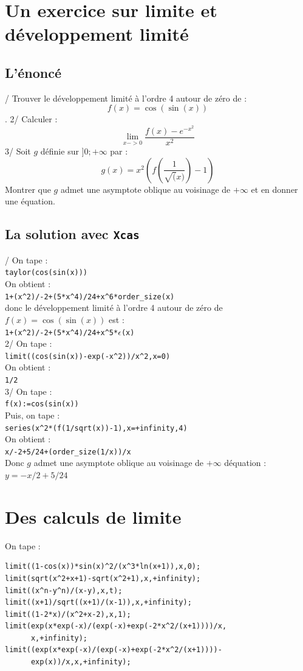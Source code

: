 \documentclass[a4paper,11pt]{book}
\begin{document}
\section{Un exercice sur limite et d\'eveloppement limit\'e}
\subsection{L'\'enonc\'e}
/ Trouver le d\'eveloppement limit\'e \`a l'ordre 4 autour de z\'ero de :
$$f(x)=\cos(\sin(x))$$.
2/ Calculer :
$$\lim_{x->0}\frac{f(x)-e^{-x^2}}{x^2}$$
3/ Soit $g$ d\'efinie sur $]0;+\infty$ par :
$$g(x)=x^2(f(\frac{1}{\sqrt(x)})-1)$$
Montrer que $g$ admet une asymptote oblique au voisinage de $+\infty$ et en 
donner une \'equation.
\subsection{La solution avec {\tt Xcas}}
/ On tape :\\
{\tt taylor(cos(sin(x)))}\\   
On obtient :\\
{\tt 1+(x\verb|^|2)/-2+(5*x\verb|^|4)/24+\verb|x^|6*order\_size(x)}\\
donc le d\'eveloppement limit\'e \`a l'ordre 4 autour de z\'ero de 
$f(x)=\cos(\sin(x))$ est :\\
{\tt 1+(x\verb|^|2)/-2+(5*x\verb|^|4)/24+\verb|x^|5*$\epsilon$(x)}\\
2/ On tape :\\
{\tt limit((cos(sin(x))-exp(-x\verb|^|2))/x\verb|^|2,x=0)}\\   
On obtient :\\
{\tt 1/2}\\
3/ On tape :\\
{\tt f(x):=cos(sin(x))}\\   
Puis, on tape :\\
{\tt series(x\verb|^|2*(f(1/sqrt(x))-1),x=+infinity,4)}\\   
On obtient :\\
{\tt x/-2+5/24+(order\_size(1/x))/x}\\
Donc $g$ admet une asymptote oblique au voisinage de $+\infty$ d\'equation :\\
$y=-x/2+5/24$

\section{Des calculs de limite}
On tape :
\begin{verbatim}
limit((1-cos(x))*sin(x)^2/(x^3*ln(x+1)),x,0);
limit(sqrt(x^2+x+1)-sqrt(x^2+1),x,+infinity);
limit((x^n-y^n)/(x-y),x,t);
limit((x+1)/sqrt((x+1)/(x-1)),x,+infinity);
limit((1-2*x)/(x^2+x-2),x,1);
limit(exp(x*exp(-x)/(exp(-x)+exp(-2*x^2/(x+1))))/x,
      x,+infinity);
limit((exp(x*exp(-x)/(exp(-x)+exp(-2*x^2/(x+1))))-
      exp(x))/x,x,+infinity);
\end{verbatim}
\end{document}
